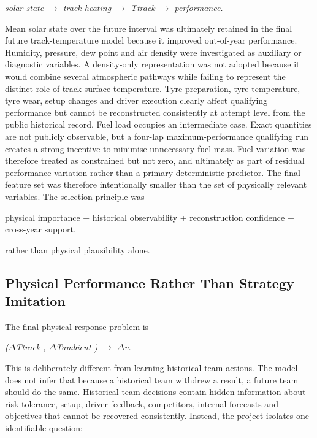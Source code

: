 \begin{center}\textit{solar state \ensuremath{\rightarrow} track heating \ensuremath{\rightarrow} Ttrack \ensuremath{\rightarrow} performance.}\end{center}

Mean solar state over the future interval was ultimately retained in the final future track-temperature model because it improved out-of-year performance. Humidity, pressure, dew point and air density were investigated as auxiliary or diagnostic variables. A density-only representation was not adopted because it would combine several atmospheric pathways while failing to represent the distinct role of track-surface temperature. Tyre preparation, tyre temperature, tyre wear, setup changes and driver execution clearly affect qualifying performance but cannot be reconstructed consistently at attempt level from the public historical record. Fuel load occupies an intermediate case. Exact quantities are not publicly observable, but a four-lap maximum-performance qualifying run creates a strong incentive to minimise unnecessary fuel mass. Fuel variation was therefore treated as constrained but not zero, and ultimately as part of residual performance variation rather than a primary deterministic predictor. The final feature set was therefore intentionally smaller than the set of physically relevant variables. The selection principle was

physical importance + historical observability + reconstruction confidence + cross-year support,

rather than physical plausibility alone.

\subsection{Physical Performance Rather Than Strategy Imitation}
The final physical-response problem is

\begin{center}\textit{(\ensuremath{\Delta}Ttrack , \ensuremath{\Delta}Tambient ) \ensuremath{\rightarrow} \ensuremath{\Delta}v.}\end{center}

This is deliberately different from learning historical team actions. The model does not infer that because a historical team withdrew a result, a future team should do the same. Historical team decisions contain hidden information about risk tolerance, setup, driver feedback, competitors, internal forecasts and objectives that cannot be recovered consistently. Instead, the project isolates one identifiable question:

